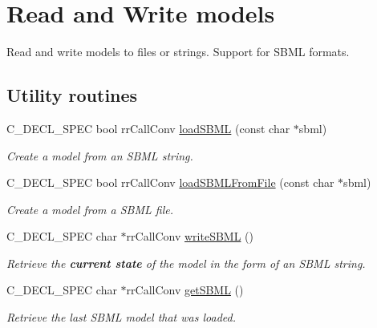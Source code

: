 \hypertarget{group__loadsave}{
\section{\-Read and \-Write models}
\label{group__loadsave}
}


\-Read and write models to files or strings. \-Support for \-S\-B\-M\-L formats.  


\subsection*{\-Utility routines}
\begin{DoxyCompactItemize}
\item 
\-C\-\_\-\-D\-E\-C\-L\-\_\-\-S\-P\-E\-C bool rr\-Call\-Conv \hyperlink{group__utility_ga4105f02dfdb959175f30cecebfb1c081}{load\-S\-B\-M\-L} (const char $\ast$sbml)
\begin{DoxyCompactList}\small\item\em \-Create a model from an \-S\-B\-M\-L string. \end{DoxyCompactList}\item 
\-C\-\_\-\-D\-E\-C\-L\-\_\-\-S\-P\-E\-C bool rr\-Call\-Conv \hyperlink{group__utility_ga3147e10d84bddb6435bee4b1db0514bf}{load\-S\-B\-M\-L\-From\-File} (const char $\ast$sbml)
\begin{DoxyCompactList}\small\item\em \-Create a model from a \-S\-B\-M\-L file. \end{DoxyCompactList}\item 
\-C\-\_\-\-D\-E\-C\-L\-\_\-\-S\-P\-E\-C char $\ast$rr\-Call\-Conv \hyperlink{group__utility_ga7d683d70e6966107f81a3e8c547bcd76}{write\-S\-B\-M\-L} ()
\begin{DoxyCompactList}\small\item\em \-Retrieve the {\bfseries current state} of the model in the form of an \-S\-B\-M\-L string. \end{DoxyCompactList}\item 
\-C\-\_\-\-D\-E\-C\-L\-\_\-\-S\-P\-E\-C char $\ast$rr\-Call\-Conv \hyperlink{group__utility_ga05a79ded419b52fa2965fce1700c0e82}{get\-S\-B\-M\-L} ()
\begin{DoxyCompactList}\small\item\em \-Retrieve the last \-S\-B\-M\-L model that was loaded. \end{DoxyCompactList}\end{DoxyCompactItemize}


